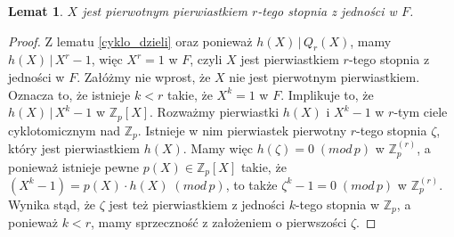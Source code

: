 \documentclass[declaration,shortabstract]{iithesis}
\theoremstyle{definition}
\theoremstyle{remark} \newtheorem{observation}{Obserwacja}
\theoremstyle{plain} \newtheorem{theorem}{Twierdzenie}
\theoremstyle{plain} \newtheorem{lemma}{Lemat}
\theoremstyle{remark} \newtheorem*{remark*}{Uwaga}
\theoremstyle{reminder} \newtheorem*{reminder*}{Przypomnienie}
\begin{document}
\begin{lemma}\label{X_pierw}
	$X$ jest pierwotnym pierwiastkiem $r$-tego stopnia z jedności w $F$.
\end{lemma}
	
\begin{proof}
    Z lematu \ref{cyklo_dzieli} oraz ponieważ $h(X) \, | \, Q_r(X)$, mamy $h(X) \, | \, X^r - 1$, więc $X^r = 1$ w $F$, czyli $X$ jest pierwiastkiem $r$-tego stopnia z jedności w $F$. 
    Załóżmy nie wprost, że $X$ nie jest pierwotnym pierwiastkiem. Oznacza to, że istnieje $k < r$ takie, że $X^k = 1$ w $F$. Implikuje to, że $h(X) \, | \, X^k - 1$ w $\mathbb{Z}_p[X]$. 
    Rozważmy pierwiastki $h(X)$ i $X^k - 1$ w $r$-tym ciele cyklotomicznym nad $\mathbb{Z}_p$. Istnieje w nim pierwiastek pierwotny $r$-tego stopnia $\zeta$, który jest pierwiastkiem $h(X)$. 
    Mamy więc $h(\zeta) = 0 \; (mod \, p)$ w $\mathbb{Z}_p^{(r)}$, a ponieważ istnieje pewne $p(X) \in \mathbb{Z}_p[X]$ takie, że $(X^k - 1) = p(X) \cdot h(X) \; (mod \, p)$, to także $\zeta^k - 1 = 0 \; (mod \, p)$ w $\mathbb{Z}_p^{(r)}$. Wynika stąd, że $\zeta$ jest też pierwiastkiem z jedności $k$-tego stopnia w $\mathbb{Z}_p$, a ponieważ $k < r$, mamy sprzeczność z założeniem o pierwszości $\zeta$.
\end{proof}

	
\end{document}
